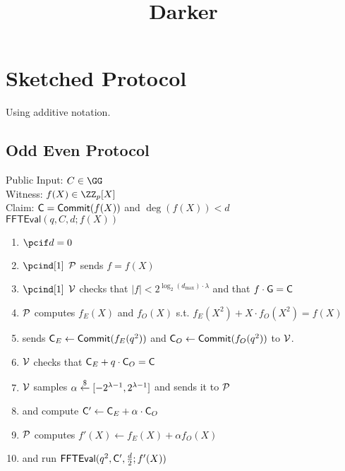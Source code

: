 \documentclass[12pt]{article}
\title{Darker}
\theoremstyle{Definition}
\begin{document}
	
\maketitle
\section{Sketched Protocol}
Using additive notation. 

\subsection{Odd Even Protocol}
\begin{mdframed}
Public Input: $C\in \GG$\\
Witness: $f(X) \in \ZZ_p[X]$ \\
Claim: $\mathsf{C} =\textsf{{Commit}}(f(X))$ and $\deg(f(X))<d$	\\
$\textsf{FFTEval}(q,C,d;f(X))$
\begin{enumerate}[nolistsep]
		\item $\pcif d=0$
		\item $\pcind[1]$ $\mathcal{P}$ sends $f=f(X)$
		\item $\pcind[1]$ $\mathcal{V}$ checks that $|f|<2^{\log_2(d_{\max}) \cdot \lambda}$ and that $f \cdot \mathsf{G}=\mathsf{C}$
		\item $\mathcal{P}$ computes $f_E(X)$ and $f_O(X)$ s.t. $f_E(X^2)+X \cdot f_O(X^2)=f(X)$ 
		\item \prover sends $\mathsf{C}_E\gets \textsf{{Commit}}(f_E(q^2))$ and $\mathsf{C}_O\gets \textsf{{Commit}}(f_O(q^2))$ to $\mathcal{V}$.
		\item $\mathcal{V}$ checks that $\mathsf{C}_E+ q\cdot \mathsf{C}_O=\mathsf{C}$ 
		\item $\mathcal{V}$ samples $\alpha \overset{\$}{\gets} [-2^{\lambda-1},2^{\lambda-1}]$ and sends it to $\mathcal{P}$
		\item \prover and \verifier compute $\mathsf{C}'\gets \mathsf{C}_E+\alpha \cdot \mathsf{C}_O$
		\item $\mathcal{P}$ computes $f'(X)\gets f_E(X)+\alpha f_O(X)$
		\item \prover and \verifier run $\textsf{FFTEval}(q^2,\mathsf{C}',\frac{d}{2};f'(X))$
	\end{enumerate}
\end{mdframed}
\end{document}
